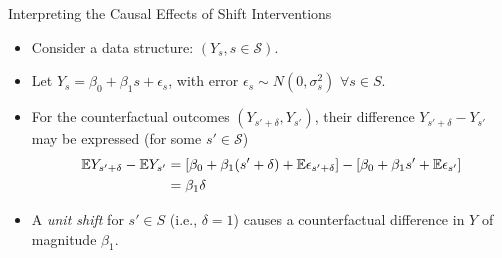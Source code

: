 \documentclass{beamer}
\begin{document}

\begin{frame}[c]{Interpreting the Causal Effects of Shift Interventions}

\begin{center}
\begin{itemize}
  \itemsep6pt
  \item Consider a data structure: $(Y_s, s \in \mathcal{S})$.
  \item Let $Y_s = \beta_0 + \beta_1 s + \epsilon_s$, with error $\epsilon_s
    \sim N(0, \sigma^2_s)$ $\forall s \in S$.
  \item For the counterfactual outcomes $(Y_{s' + \delta}, Y_{s'})$, their
    difference $Y_{s' + \delta} - Y_{s'}$ may be expressed (for some
    $s' \in \mathcal{S}$)
    \begin{align*}
      \mathbb{E} Y_{s' + \delta} - \mathbb{E} Y_{s'} &= [\beta_0 + \beta_1 (s' + \delta) +
          \mathbb{E} \epsilon_{s' + \delta}] - [\beta_0 + \beta_1 s' +
          \mathbb{E} \epsilon_{s'}] \\
        &= \beta_1 \delta
    \end{align*}
  \item A \textit{unit shift} for $s' \in S$ (i.e., $\delta = 1$) causes a
    counterfactual difference in $Y$ of magnitude $\beta_1$.
\end{itemize}
\end{center}


\end{frame}

\end{document}
